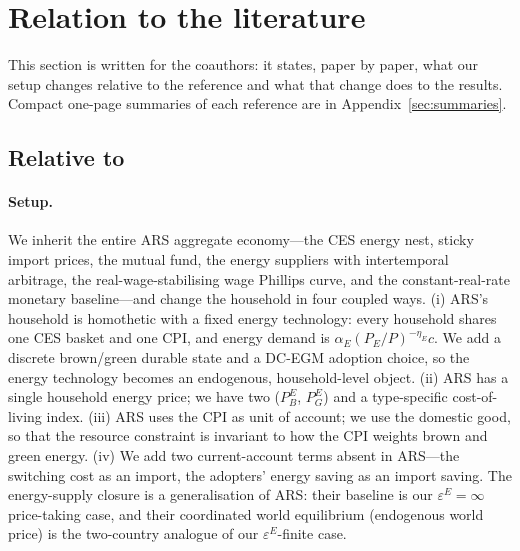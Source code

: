 \documentclass[11pt,a4paper]{article}
\begin{document}
\section{Relation to the literature}
\label{sec:lit}

This section is written for the coauthors: it states, paper by paper, what our
setup changes relative to the reference and what that change does to the
results. Compact one-page summaries of each reference are in
Appendix~\ref{sec:summaries}.

\subsection{Relative to \citet{ARS2024}}

\paragraph{Setup.} We inherit the entire ARS aggregate economy---the CES
energy nest, sticky import prices, the mutual fund, the energy suppliers with
intertemporal arbitrage, the real-wage-stabilising wage Phillips curve, and the
constant-real-rate monetary baseline---and change the household in four coupled
ways. (i) ARS's household is homothetic with a fixed energy technology: every
household shares one CES basket and one CPI, and energy demand is
$\alpha_E(P_E/P)^{-\eta_E}c$. We add a discrete brown/green durable state and a
DC-EGM adoption choice, so the energy technology becomes an endogenous,
household-level object. (ii) ARS has a single household energy price; we have
two ($P^E_B$, $P^E_G$) and a type-specific cost-of-living index. (iii) ARS uses
the CPI as unit of account; we use the domestic good, so that the resource
constraint is invariant to how the CPI weights brown and green energy. (iv) We
add two current-account terms absent in ARS---the switching cost as an import,
the adopters' energy saving as an import saving. The energy-supply closure is a
generalisation of ARS: their baseline is our $\varepsilon^E=\infty$
price-taking case, and their coordinated world equilibrium (endogenous world
price) is the two-country analogue of our $\varepsilon^E$-finite case.
\end{document}
